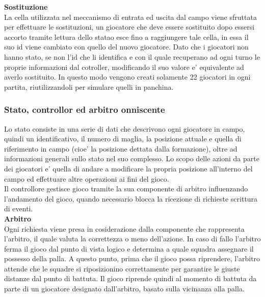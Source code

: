 \textbf{Sostituzione}\\

La cella utilizzata nel meccanismo di entrata ed uscita dal campo viene sfruttata per effettuare le sostituzioni, un giocatore che deve essere sostituito dopo essersi accorto tramite lettura dello statao esce fino a raggiungere tale cella, in essa il suo id viene cambiato con quello del nuovo giocatore. Dato che i giocatori non hanno stato, se non l'id che li identifica e con il quale recuperano ad ogni turno le proprie informazioni dal cotroller, modificando il suo valore e' equivalente ad averlo sostituito. In questo modo vengono creati solamente 22 giocatori in ogni partita, riutilizzandoli per simulare quelli in panchina.\\

\subsubsection{Stato, controllor ed arbitro onniscente}
\label{sec:analisi_concorrenza_controller_arbitro}

Lo stato consiste in una serie di dati che descrivono ogni giocatore in campo, quindi un identificativo, il numero di maglia, la posizione attuale e quella di riferimento in campo (cioe' la posizione dettata dalla formazione), oltre ad informazioni generali sullo stato nel suo complesso. Lo scopo delle azioni da parte dei giocatori e' quella di andare a modificare la propria posizione all'interno del campo ed effettuare altre operazioni ai fini del gioco.\\

Il controllore gestisce gioco tramite la sua componente di arbitro influenzando l'andamento  del gioco, quando necessario blocca la ricezione di richieste scrittura di eventi.\\

\textbf{Arbitro}\\

Ogni richiesta viene presa in cosiderazione dalla componente che rappresenta l'arbitro, il quale valuta la correttezza o meno dell'azione. In caso di fallo l'arbitro ferma il gioco dal punto di vista logico e determina a quale squadra assegnare il possesso della palla. A questo punto, prima che il gioco possa riprendere, l'arbitro attende che le squadre si riposizionino correttamente per garantire le giuste distanze dal punto di battuta. Il gioco riprende quindi al momento di battuta da parte di un giocatore designato dall'arbitro, basato sulla vicinanza alla palla.\\

